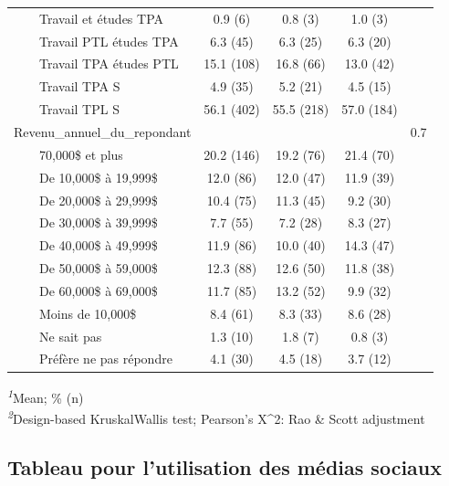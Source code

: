\documentclass[
]{article}
\begin{document}
\begin{table}[!t]
\begin{tabular*}{\linewidth}{@{\extracolsep{\fill}}lcccc}
    Travail et études TPA & 0.9   (6) & 0.8   (3) & 1.0   (3) &  \\ 
    Travail PTL études TPA & 6.3   (45) & 6.3   (25) & 6.3   (20) &  \\ 
    Travail TPA études PTL & 15.1   (108) & 16.8   (66) & 13.0   (42) &  \\ 
    Travail TPA S & 4.9   (35) & 5.2   (21) & 4.5   (15) &  \\ 
    Travail TPL S & 56.1   (402) & 55.5   (218) & 57.0   (184) &  \\ 
Revenu\_annuel\_du\_repondant &  &  &  & 0.7 \\ 
    70,000\$ et plus & 20.2   (146) & 19.2   (76) & 21.4   (70) &  \\ 
    De 10,000\$ à 19,999\$ & 12.0   (86) & 12.0   (47) & 11.9   (39) &  \\ 
    De 20,000\$ à 29,999\$ & 10.4   (75) & 11.3   (45) & 9.2   (30) &  \\ 
    De 30,000\$ à 39,999\$ & 7.7   (55) & 7.2   (28) & 8.3   (27) &  \\ 
    De 40,000\$ à 49,999\$ & 11.9   (86) & 10.0   (40) & 14.3   (47) &  \\ 
    De 50,000\$ à 59,000\$ & 12.3   (88) & 12.6   (50) & 11.8   (38) &  \\ 
    De 60,000\$ à 69,000\$ & 11.7   (85) & 13.2   (52) & 9.9   (32) &  \\ 
    Moins de 10,000\$ & 8.4   (61) & 8.3   (33) & 8.6   (28) &  \\ 
    Ne sait pas & 1.3   (10) & 1.8   (7) & 0.8   (3) &  \\ 
    Préfère ne pas répondre & 4.1   (30) & 4.5   (18) & 3.7   (12) &  \\ 
\bottomrule
\end{tabular*}
\begin{minipage}{\linewidth}
\textsuperscript{\textit{1}}Mean; \%   (n)\\
\textsuperscript{\textit{2}}Design-based KruskalWallis test; Pearson's X\^{}2: Rao \& Scott adjustment\\
\end{minipage}
\end{table}
\vspace{1cm}

\hypertarget{tableau-pour-lutilisation-des-muxe9dias-sociaux}{%
\subsection{Tableau pour l'utilisation des médias
sociaux}\label{tableau-pour-lutilisation-des-muxe9dias-sociaux}}
\end{document}
